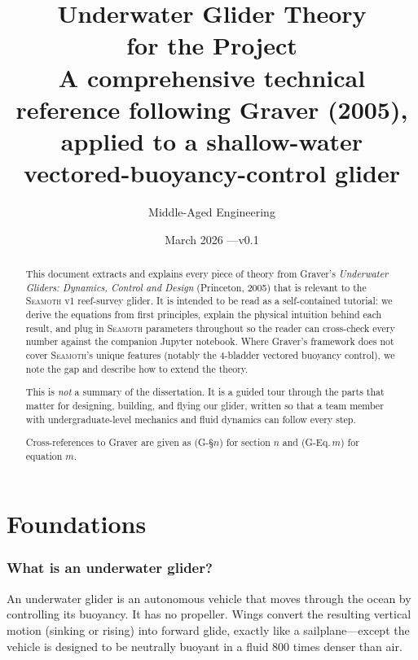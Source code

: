 \documentclass[11pt,a4paper]{article}
\title{\vspace{-1cm}\textbf{Underwater Glider Theory\\for the \seamoth{} Project}\\[8pt]
\large A comprehensive technical reference following Graver (2005),\\
applied to a shallow-water vectored-buoyancy-control glider}
\author{Middle-Aged Engineering}
\date{March 2026 \quad---\quad v0.1}
\newcommand{\seamoth}{\textsc{Seamoth}}
\begin{document}
\maketitle

\begin{abstract}
This document extracts and explains every piece of theory from Graver's
\emph{Underwater Gliders: Dynamics, Control and Design} (Princeton, 2005) that is
relevant to the \seamoth{} v1 reef-survey glider.  It is intended to be read
as a self-contained tutorial: we derive the equations from first principles, explain
the physical intuition behind each result, and plug in \seamoth{} parameters throughout
so the reader can cross-check every number against the companion Jupyter notebook.
Where Graver's framework does not cover \seamoth{}'s unique features (notably the
4-bladder vectored buoyancy control), we note the gap and describe how to extend
the theory.

This is \emph{not} a summary of the dissertation.  It is a guided tour through the
parts that matter for designing, building, and flying our glider, written so that
a team member with undergraduate-level mechanics and fluid dynamics can follow every step.

Cross-references to Graver are given as (G-\S$n$) for section $n$ and (G-Eq.$\,m$) for
equation $m$.
\end{abstract}

\tableofcontents
\newpage

\part{Foundations}

\section{What is an underwater glider?}
\label{sec:intro}

An underwater glider is an autonomous vehicle that moves through the ocean by
controlling its buoyancy.  It has no propeller.  Wings convert the resulting vertical
motion (sinking or rising) into forward glide, exactly like a sailplane---except
the vehicle is designed to be neutrally buoyant in a fluid 800 times denser than air.
\end{document}
